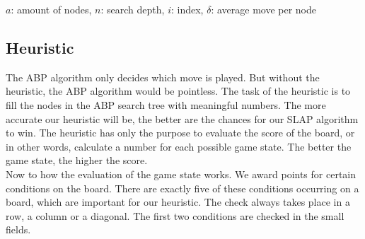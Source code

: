 \begin{center}
$a$: amount of nodes,
$n$: search depth,
$i$: index,
$\delta$: average move per node
\end{center}


\subsection{Heuristic}
The \ac{ABP} algorithm only decides which move is played. But without the heuristic, the \ac{ABP} algorithm would be pointless. The task of the heuristic is to fill the nodes in the \ac{ABP} search tree with meaningful numbers. The more accurate our heuristic will be, the better are the chances for our \ac{SLAP} algorithm to win. The heuristic has only the purpose to evaluate the score of the board, or in other words, calculate a number for each possible  \ac{game state}. The better the game state, the higher the score.\\

Now to how the evaluation of the game state works. We award points for certain  \acp{condition} on the board. There are exactly five of these conditions occurring on a board, which are important for our heuristic. The check always takes place in a row, a column or a diagonal. The first two conditions are checked in the small fields.\\


